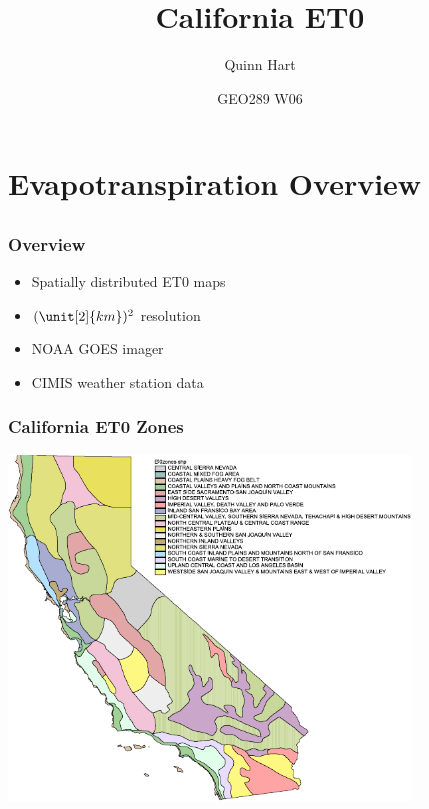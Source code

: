 \documentclass{beamer}
\title[ET0] %
{California \ac{ET0}}
\author{Quinn Hart}
\institute[CalSpace] %
{
  CalSpace \\
  University of California, Davis \\
  qjhart@ucdavis.edu
}
\date[GEO289 W06] %
{GEO289 W06}
\begin{document}
\titlepage
\section[Overview]{Evapotranspiration Overview}

\subsection{}

\begin{frame}
  \frametitle{Overview}
  \begin{itemize}
  \item Spatially distributed ET0 maps
  \item $(\unit[2]{km})^2$ resolution
  \item \ac{NOAA} \ac{GOES} imager
  \item \ac{CIMIS} weather station data
  \end{itemize}

\end{frame}

\begin{frame}
  \frametitle{California \ac{ET0} Zones}
  \includegraphics[width=0.8\textwidth]{etomap_simple.pdf}
\end{frame}
\end{document}
